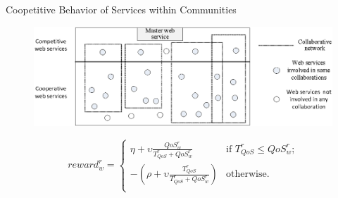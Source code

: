 \documentclass{beamer}
\begin{document}
\begin{frame}{Coopetitive Behavior of Services within Communities}
    \begin{figure}[h]
        \centering
        \includegraphics[scale=0.6]{figures/architecture++.eps}
        \label{architectureFigure}
    \end{figure}

    \begin{equation*} \label{repr}
        reward_w^r = \begin{cases}
        \eta + \upsilon \frac{QoS_w^r}{T_{QoS}^r+QoS_w^r}   & \text{if $T_{QoS}^r\leq QoS_w^r$;}\\
        -(\rho +  \upsilon \frac{T_{QoS}^r}{T_{QoS}^r+QoS_w^r} ) & \text{otherwise.}\\
        \end{cases}
    \end{equation*}



%


\end{frame}
\end{document}
